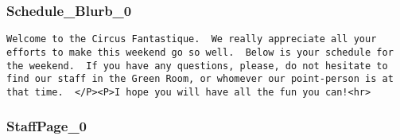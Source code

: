 \documentclass[captions=tablesignature]{scrartcl}
\begin{document}
\subsubsection{Schedule\_Blurb\_0}
\label{sec-3-5-3}
\begin{verbatim}
Welcome to the Circus Fantastique.  We really appreciate all your
efforts to make this weekend go so well.  Below is your schedule for
the weekend.  If you have any questions, please, do not hesitate to
find our staff in the Green Room, or whomever our point-person is at
that time.  </P><P>I hope you will have all the fun you can!<hr>
\end{verbatim}

\subsubsection{StaffPage\_0}
\label{sec-3-5-4}
\end{document}
